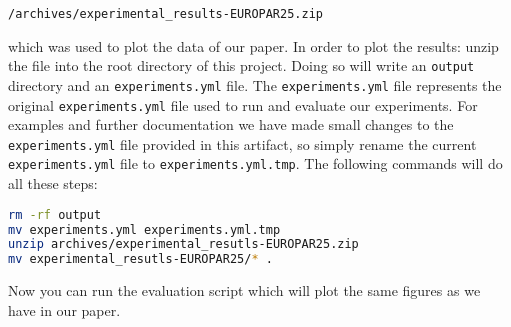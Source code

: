 \documentclass[11pt, a4paper]{scrartcl}
\newcommand{\expfile}{\texttt{experiments.yml} file\xspace}
\begin{document}
\texttt{/archives/experimental\_results-EUROPAR25.zip}

\noindent which was used to plot the data of our paper. In order to plot the results:
unzip the file into the root directory of this project. Doing so will write an
\texttt{output} directory and an \texttt{experiments.yml} file. The
\texttt{experiments.yml} file represents the original \texttt{experiments.yml}
file used to run and evaluate our experiments. For examples and further
documentation we have made small changes to the \expfile provided in this
artifact, so simply rename the current \expfile to \texttt{experiments.yml.tmp}.
The following commands will do all these steps:

\begin{lstlisting}[language=bash]
rm -rf output
mv experiments.yml experiments.yml.tmp
unzip archives/experimental_resutls-EUROPAR25.zip
mv experimental_resutls-EUROPAR25/* .
\end{lstlisting}

Now you can run the evaluation script which will plot the same figures as we
have in our paper.
\end{document}
